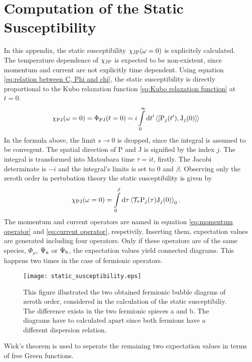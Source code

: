 %
%
\chapter{Computation of the Static Susceptibility}
\label{appch:static susceptibility}
%
%
In this appendix, the static susceptibility $\chi_{\mathrm{JP}}(\omega=0)$ is explicitely calculated.
The temperature dependence of $\chi_{\mathrm{JP}}$ is expected to be non-existent, since momentum and current are not explicitly time dependent.
Using equation \eqref{eq:relation between C, Phi and chi}, the static susceptibility is directly proportional to the Kubo relaxation function \eqref{eq:Kubo relaxation function} at $t=0$.
%
\begin{align}
	\chi_{\mt{PJ}}(\omega = 0) = \Phi_{\mt{PJ}}(t = 0) = i \int\limits_{0}^{\infty} \dd{t'} \expval{\comm{\mt{P}_{j}(t')}{\mt{J}_{j}(0)}}
\end{align}
%
In the formula above, the limit $s\to0$ is dropped, since the integral is assumed to be convegent.
The spatial direction of P and J is signified by the index $j$.
The integral is transformed into Matsubara time $\tau = it$, firstly.
The Jacobi determinate is $-i$ and the integral's limits is set to $0$ and $\beta$.
Observing only the zeroth order in pertubation theory the static susceptibility is given by
%
\begin{align}
	\chi_{\mathrm{PJ}}(\omega = 0) = \int\limits_{0}^{\beta} \dd{\tau} \expval{\mathcal{T}_{\tau} \mathrm{P}_{j}(\tau) \mathrm{J}_{j}(0)}_{0}.
\end{align}
%
The momentum and current operators are named in equation \eqref{eq:momentum operator} and \eqref{eq:current operator}, respetivily.
Inserting them, expectation values are generated including four operators.
Only if these operators are of the same species, $\Phi_{\mu}$, $\Psi_{\mathrm{a}}$ or $\Psi_{\mathrm{b}}$, the expectation values yield connected diagrams.
This happens two times in the case of fermionic operators.
%
\begin{figure}[t]
	\centering
	\texttt{[image: static\_susceptibility.eps]}
	\caption{
This figure illustrated the two obtained fermionic bubble diagrms of zeroth order, considered in the calculation of the static susceptibiliy.
The difference exists in the two fermionic spieces a and b.
The diagrams have to calculated apart since both fermions have a different dispersion relation.
	}
	\label{fig:static susceptibility}
\end{figure}
%
Wick's theorem is used to seperate the remaining two expectation values in terms of free Green functions.
